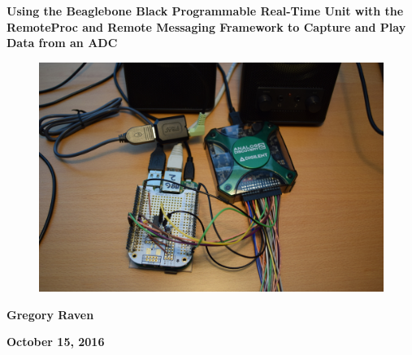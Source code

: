 \thispagestyle{empty}
{\centering\bfseries\color{black}\Huge
Using the Beaglebone Black Programmable Real-Time Unit with the RemoteProc and Remote Messaging Framework to Capture and Play Data from an ADC
\par}

\bigskip

\begin{figure}
	\centering
	\includegraphics[width=\textwidth]{photos/DSC_0021}
\end{figure}

\bigskip
{\centering\bfseries\Large
Gregory Raven
\par}


\bigskip
{\centering\bfseries\LARGE
October 15, 2016
\par}



